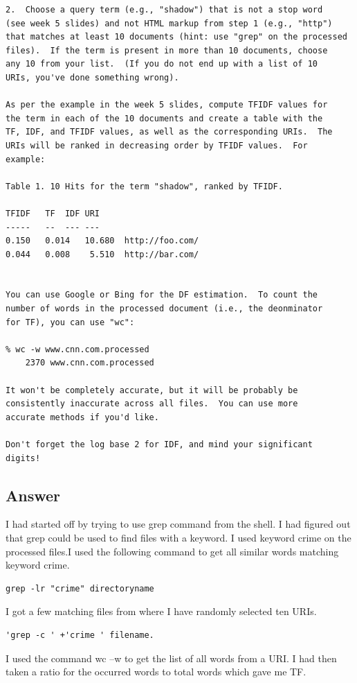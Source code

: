 \documentclass[letterpaper,11pt]{article}
\begin{document}
\begingroup
\fontsize{8pt}{10pt}\selectfont
\begin{verbatim}
2.  Choose a query term (e.g., "shadow") that is not a stop word
(see week 5 slides) and not HTML markup from step 1 (e.g., "http")
that matches at least 10 documents (hint: use "grep" on the processed
files).  If the term is present in more than 10 documents, choose
any 10 from your list.  (If you do not end up with a list of 10
URIs, you've done something wrong).

As per the example in the week 5 slides, compute TFIDF values for
the term in each of the 10 documents and create a table with the
TF, IDF, and TFIDF values, as well as the corresponding URIs.  The
URIs will be ranked in decreasing order by TFIDF values.  For
example:

Table 1. 10 Hits for the term "shadow", ranked by TFIDF.

TFIDF	TF	IDF	URI
-----	--	---	---
0.150	0.014	10.680	http://foo.com/
0.044	0.008	 5.510	http://bar.com/


You can use Google or Bing for the DF estimation.  To count the
number of words in the processed document (i.e., the deonminator
for TF), you can use "wc":

% wc -w www.cnn.com.processed
    2370 www.cnn.com.processed

It won't be completely accurate, but it will be probably be
consistently inaccurate across all files.  You can use more 
accurate methods if you'd like.  

Don't forget the log base 2 for IDF, and mind your significant
digits!

\end{verbatim}
\endgroup


\newpage
\subsection*{Answer}
I had started off by trying to use grep command from the shell. I had figured out that grep could be used to find files with a keyword. I used keyword crime on the processed files.I used the following command to get all similar words matching keyword crime.
\begin{lstlisting}[frame=single]
 grep -lr "crime" directoryname
\end{lstlisting}
I got a few matching files from where I have randomly selected ten URIs.
\begin{lstlisting}[frame=single]
 'grep -c ' +'crime ' filename.
\end{lstlisting}
I used the command wc –w  to get the list of all words from a URI. I had then taken a ratio for the occurred words to total words which gave me TF.
\end{document}
